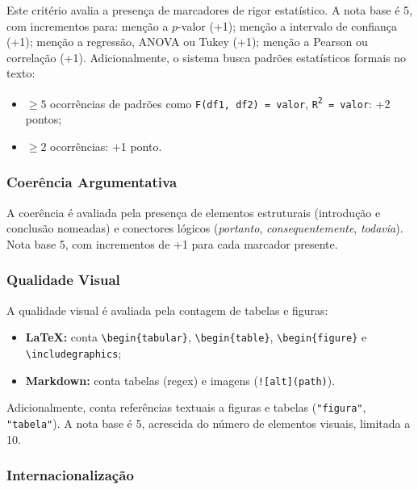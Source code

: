 Este critério avalia a presença de marcadores de rigor
estatístico. A nota base é 5, com incrementos para: menção a
$p$-valor (+1); menção a intervalo de confiança (+1); menção a
regressão, ANOVA ou Tukey (+1); menção a Pearson ou correlação
(+1). Adicionalmente, o sistema busca padrões estatísticos
formais no texto:

\begin{itemize}
    \item $\geq 5$ ocorrências de padrões como
    \texttt{F(df1, df2) = valor}, \texttt{R\textsuperscript{2} =
    valor}: +2 pontos;

    \item $\geq 2$ ocorrências: +1 ponto.
\end{itemize}

\subsubsection{Coerência Argumentativa}
\label{sec:criterio7}

A coerência é avaliada pela presença de elementos estruturais
(introdução e conclusão nomeadas) e conectores lógicos
(\textit{portanto}, \textit{consequentemente}, \textit{todavia}).
Nota base 5, com incrementos de +1 para cada marcador presente.

\subsubsection{Qualidade Visual}
\label{sec:criterio8}

A qualidade visual é avaliada pela contagem de tabelas e figuras:

\begin{itemize}
    \item \textbf{LaTeX:} conta \verb|\begin{tabular}|,
    \verb|\begin{table}|, \verb|\begin{figure}| e
    \verb|\includegraphics|;

    \item \textbf{Markdown:} conta tabelas (regex) e imagens
    (\verb|![alt](path)|).
\end{itemize}

Adicionalmente, conta referências textuais a figuras e tabelas
(\texttt{"figura"}, \texttt{"tabela"}). A nota base é 5,
acrescida do número de elementos visuais, limitada a 10.

\subsubsection{Internacionalização}
\label{sec:criterio9}

